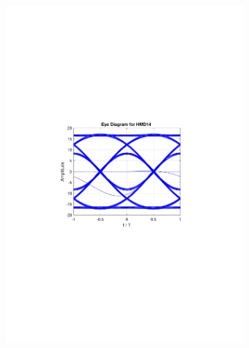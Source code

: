 \begin{figure}
	\centering
	\begin{subfigure}{.5\textwidth}
		\centering
		\includegraphics[clip, trim=5cm 10cm 5cm 10cm, width=\textwidth]{./sdf/m_qam_system/figures/HMD14_eye_diagram_0.pdf}
	\end{subfigure}%
	\begin{subfigure}{.5\textwidth}
		\centering

\end{subfigure}
\end{figure}
